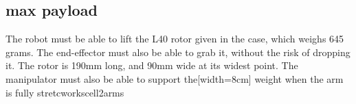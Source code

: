 \subsection{max payload}

The robot must be able to lift the L40 rotor given in the case, which weighs 645 grams. The end-effector must also be able to grab it, without the risk of dropping it. The rotor is 190mm long, and 90mm wide at its widest point. The manipulator must also be able to support the[width=8cm] weight when the arm is fully stretcworkscell2arms















